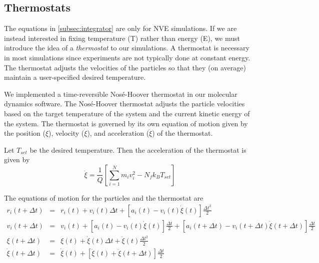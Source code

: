 \documentclass[12pt]{article}
\begin{document}
\subsection{Thermostats} \label{subsec:thermostat}
The equations in \ref{subsec:integrator} are only for NVE simulations.
%
If we are instead interested in fixing temperature (T) rather than energy (E), we must introduce the idea of a {\em thermostat} to our simulations.
%
A thermostat is necessary in most simulations since experiments are not typically done at constant energy.
%
The thermostat adjusts the velocities of the particles so that they (on average) maintain a user-specified desired temperature.

We implemented a time-reversible Nos\'{e}-Hoover thermostat in our molecular dynamics software.
%
The Nos\'{e}-Hoover thermostat adjusts the particle velocities based on the target temperature of the system and the current kinetic energy of the system.
%
The thermostat is governed by its own equation of motion given by the position ($\xi$), velocity ($\dot{\xi}$), and acceleration ($\ddot{\xi}$) of the thermostat.

Let $T_{set}$ be the desired temperature.
%
Then the acceleration of the thermostat is given by
\begin{equation}
\ddot{\xi} = \frac{1}{Q} \left[ \sum_{i=1}^{N} m_i v_i^2 - N_f k_B T_{set} \right]
\end{equation}

The equations of motion for the particles and the thermostat are
\begin{eqnarray}
r_i(t + \Delta t) &=& r_i(t) + v_i(t) \Delta t + \left[ a_i(t) - v_i(t)\dot{\xi}(t) \right] \frac{\Delta t^2}{2}\\
v_i(t + \Delta t) &=& v_i(t) + \left[ a_i(t) - v_i(t) \dot{\xi}(t) \right] \frac{\Delta t}{2} + \left[a_i(t + \Delta t)  - v_i(t + \Delta t) \dot{\xi}(t + \Delta t) \right] \frac{\Delta t}{2} \\
\xi(t + \Delta t) & = & \xi(t) + \dot{\xi}(t) \Delta t + \ddot{\xi}(t) \frac{\Delta t^2 }{2} \\
\dot{\xi}(t + \Delta t)  & = & \dot{\xi}(t) + \left[ \ddot{\xi}(t) + \ddot{\xi} (t + \Delta t)  \right] \frac{\Delta t}{2}
\end{eqnarray}
\end{document}
